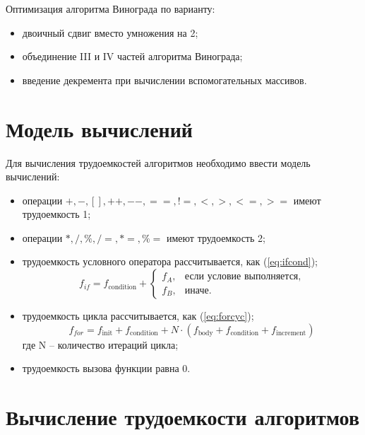 Оптимизация алгоритма Винограда по варианту:
\begin{itemize}
    \item двоичный сдвиг вместо умножения на 2;
    \item объединение III и IV частей алгоритма Винограда;
    \item введение декремента при вычислении вспомогательных массивов.
\end{itemize}

\clearpage


\section{Модель вычислений}

Для вычисления трудоемкостей алгоритмов необходимо ввести модель вычислений:

\begin{itemize}
    \item операции $+, -, [], ++, {-}-, ==, !=, <, >, <=, >=$ имеют трудоемкость 1;
    \item операции $*, /, \%, /=,  *=, \%=$ имеют трудоемкость 2;
    \item трудоемкость условного оператора  рассчитывается, как (\ref{eq:ifcond});
    \begin{equation}
        \label{eq:ifcond}
        f_{if} = f_{\text{condition}} +
        \begin{cases}
            f_A, & \text{если условие выполняется,}\\
            f_B, & \text{иначе.}
        \end{cases}
    \end{equation}
    \item трудоемкость цикла  рассчитывается, как (\ref{eq:forcyc});
    \begin{equation}
        \label{eq:forcyc}
        f_{for} = f_{\text{init}} + f_{\text{condition}} + N\cdot(f_{\text{body}} + f_{\text{condition}} + f_{\text{increment}})
    \end{equation}
    где N -- количество итераций цикла;
    \item трудоемкость вызова функции равна 0.
\end{itemize}


\section{Вычисление трудоемкости алгоритмов}

